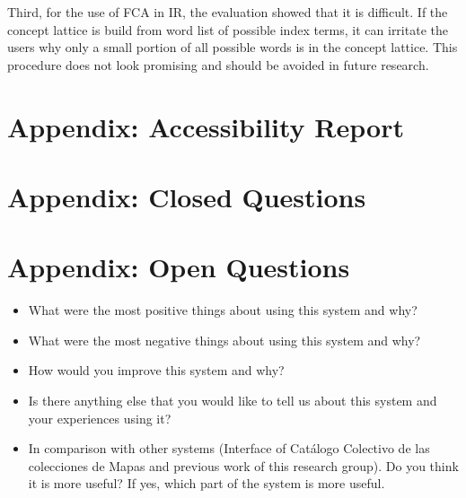\documentclass[11pt]{report}
\begin{document}
Third, for the use of FCA in IR, the evaluation showed that it is difficult. If the concept lattice is build from word list of possible index terms, it can irritate the users why only a small portion of all possible words is in the concept lattice. This procedure does not look promising and should be avoided in future research.
\newpage



\newpage
\appendix
\chapter{Appendix: Accessibility Report}
\label{app:access}



\chapter{Appendix: Closed Questions}
\label{app:closed}



\chapter{Appendix: Open Questions}
\label{app:open}

\begin{itemize}
	\item What were the most positive things about using this system and why?
	\item What were the most negative things about using this system and why?
	\item How would you improve this system and why?
	\item Is there anything else that you would like to tell us about this system and your experiences using it?
	\item In comparison with other systems (Interface of Catálogo Colectivo de las colecciones de Mapas and previous work of this research group).
Do you think it is more useful? If yes, which part of the system is more useful.
\end{itemize}
\end{document}
